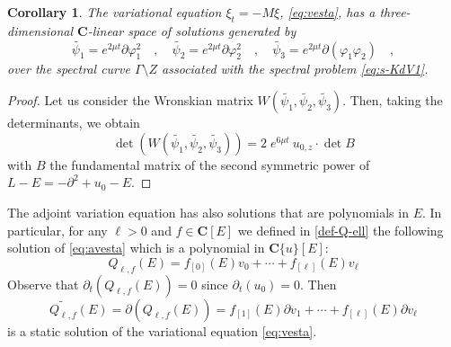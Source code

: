 \documentclass[a4paper,12pt]{article}
\newcommand{\coC}{\mathbf{C}}
\newtheorem{cor}[thm]{Corollary}
\begin{document}
\begin{cor} The  variational equation $\xi_t= -M \xi$, \eqref{eq:vesta}, has a  three-dimensional $\coC$-linear space of solutions generated by 
\[
\widetilde{\psi_1 } = e^{2\mu t}\partial\varphi^2_1
\quad , \quad 
\widetilde{\psi_2 } =  e^{2\mu t}\partial\varphi^2_2
\quad , \quad 
\widetilde{\psi_3 } =  e^{2\mu t}\partial (\varphi_1 \varphi_2 )
\quad , 
\]
over the spectral curve $\Gamma \setminus Z$ associated with the spectral problem     \eqref{eq:s-KdV1}.
\end{cor}

\begin{proof}  Let us consider the Wronskian  matrix $ W (\widetilde{\psi_1 }  , \widetilde{\psi_2 }  , \widetilde{\psi_3 } ) $. Then, taking the determinants, we obtain
\[
\det 
\left(
 W (\widetilde{\psi_1 }  , \widetilde{\psi_2 }  , \widetilde{\psi_3 } ) 
\right) = 2\;e^{6\mu t } \: u_{0,z} \cdot \det B 
\]
with $B$ the fundamental matrix of the second symmetric power of $L-E = -\partial^2 +u_0 -E$.  
    
\end{proof}

\medskip

 The adjoint variation equation has also solutions that are polynomials in $E$. In particular, for any $\ell >0$ and $f\in \coC[E]$ we defined in \eqref{def-Q-ell} the following solution of  \eqref{eq:avesta} which is a polynomial in $\coC\{u\}[E]$:
\[
  Q_{\ell , f } (E) = f_{[0]}(E) v_0 +\cdots + f_{[\ell]}(E) v_\ell
\]
Observe that $\partial_t (  Q_{\ell , f } (E)  )=0$ since $\partial_t (u_0 )=0$. Then
\[
\widetilde{Q_{\ell , f } }(E)=  \partial (  Q_{\ell , f } (E)  ) = f_{[1]}(E)  \partial v_1 +\cdots + f_{[\ell]}(E)  \partial v_\ell
\]
is a  static solution of the variational equation \eqref{eq:vesta}.
\end{document}
